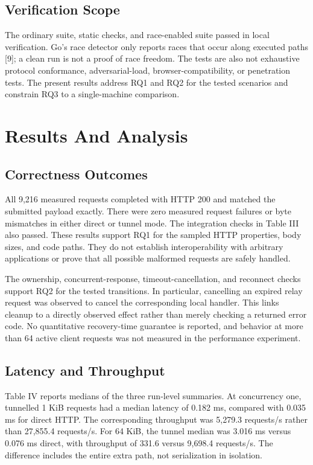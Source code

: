 \documentclass[conference]{IEEEtran}
\begin{document}
\subsection{Verification Scope}

The ordinary suite, static checks, and race-enabled suite passed in local verification. Go's race detector only reports races that occur along executed paths [9]; a clean run is not a proof of race freedom. The tests are also not exhaustive protocol conformance, adversarial-load, browser-compatibility, or penetration tests. The present results address RQ1 and RQ2 for the tested scenarios and constrain RQ3 to a single-machine comparison.

\section{Results And Analysis}

\subsection{Correctness Outcomes}

All 9,216 measured requests completed with HTTP 200 and matched the submitted payload exactly. There were zero measured request failures or byte mismatches in either direct or tunnel mode. The integration checks in Table III also passed. These results support RQ1 for the sampled HTTP properties, body sizes, and code paths. They do not establish interoperability with arbitrary applications or prove that all possible malformed requests are safely handled.

The ownership, concurrent-response, timeout-cancellation, and reconnect checks support RQ2 for the tested transitions. In particular, cancelling an expired relay request was observed to cancel the corresponding local handler. This links cleanup to a directly observed effect rather than merely checking a returned error code. No quantitative recovery-time guarantee is reported, and behavior at more than 64 active client requests was not measured in the performance experiment.

\subsection{Latency and Throughput}

Table IV reports medians of the three run-level summaries. At concurrency one, tunnelled 1 KiB requests had a median latency of 0.182 ms, compared with 0.035 ms for direct HTTP. The corresponding throughput was 5,279.3 requests/s rather than 27,855.4 requests/s. For 64 KiB, the tunnel median was 3.016 ms versus 0.076 ms direct, with throughput of 331.6 versus 9,698.4 requests/s. The difference includes the entire extra path, not serialization in isolation.
\end{document}
